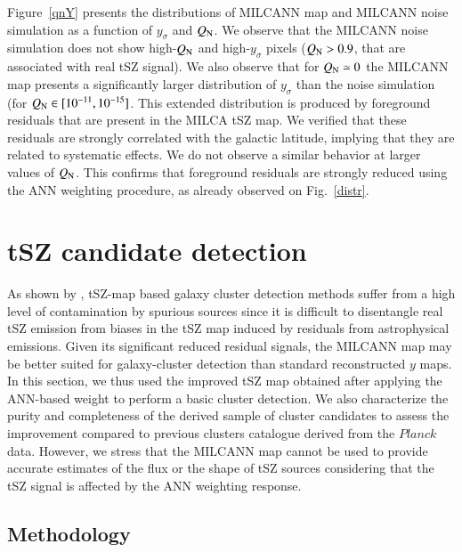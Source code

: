 \documentclass[traditabstract,a4,twocolumn]{aa}
\begin{document}
Figure~\ref{qnY} presents the distributions of MILCANN map and MILCANN
noise simulation as a function of $y_\sigma$ and $Q_{\rm
  N}$. We observe that the MILCANN noise simulation does not show
high-$Q_{\rm N}$ and high-$y_\sigma$ pixels ($Q_{\rm N} > 0.9$, that are associated with real tSZ signal). We also observe that for
$Q_{\rm N} \simeq 0$ the MILCANN map presents a significantly larger
distribution of $y_\sigma$ than the noise simulation (for $Q_{\rm N} \in [10^{-11},10^{-15}]$. This extended distribution is produced
by foreground residuals that are present in the MILCA tSZ map. We
  verified that these residuals are strongly correlated with the
  galactic latitude, implying that they are related to systematic
  effects. We do not observe a similar behavior at larger
values of $Q_{\rm N}$. This confirms that foreground residuals are
strongly reduced using the ANN weighting procedure, as already
observed on Fig.~\ref{distr}.


\section{tSZ candidate detection}
\label{carac_sec}

As shown by \citet{mel12}, tSZ-map based galaxy
   cluster detection methods suffer from a high level of contamination
   by spurious sources since it is difficult to
   disentangle real tSZ emission from biases in the tSZ map induced by residuals from
   astrophysical emissions. Given its significant reduced residual signals, the MILCANN map may be better
   suited for galaxy-cluster detection than standard reconstructed $y$ maps.
   In this section, we thus used the improved tSZ map obtained after
  applying the ANN-based weight to perform a basic cluster
  detection. We also characterize the purity and completeness of the
  derived sample of cluster candidates to assess the improvement
  compared to previous clusters catalogue derived from the $Planck$
  data. However, we stress that the MILCANN map cannot be used to
   provide accurate estimates of the flux or the shape of tSZ
   sources considering that the tSZ signal is affected by the ANN weighting response.

\subsection{Methodology}
\end{document}
